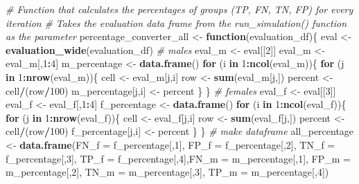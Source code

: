 \documentclass[]{article}
\newenvironment{Shaded}{\begin{snugshade}}{\end{snugshade}}
\newcommand{\KeywordTok}[1]{\textcolor[rgb]{0.13,0.29,0.53}{\textbf{#1}}}
\newcommand{\DataTypeTok}[1]{\textcolor[rgb]{0.13,0.29,0.53}{#1}}
\newcommand{\DecValTok}[1]{\textcolor[rgb]{0.00,0.00,0.81}{#1}}
\newcommand{\StringTok}[1]{\textcolor[rgb]{0.31,0.60,0.02}{#1}}
\newcommand{\CommentTok}[1]{\textcolor[rgb]{0.56,0.35,0.01}{\textit{#1}}}
\newcommand{\ControlFlowTok}[1]{\textcolor[rgb]{0.13,0.29,0.53}{\textbf{#1}}}
\newcommand{\OperatorTok}[1]{\textcolor[rgb]{0.81,0.36,0.00}{\textbf{#1}}}
\newcommand{\NormalTok}[1]{#1}
\begin{document}
\begin{Shaded}
\begin{Highlighting}[]
{{{{{{{{{{\CommentTok{# Function that calculates the percentages of groups (TP, FN, TN, FP) for every iteration}
\CommentTok{# Takes the evaluation data frame from the run_simulation() function as the parameter}
\NormalTok{percentage_converter_all <-}\StringTok{ }\ControlFlowTok{function}\NormalTok{(evaluation_df)\{}
\NormalTok{  eval <-}\StringTok{ }\KeywordTok{evaluation_wide}\NormalTok{(evaluation_df)}
  \CommentTok{# males}
\NormalTok{  eval_m <-}\StringTok{ }\NormalTok{eval[[}\DecValTok{2}\NormalTok{]]}
\NormalTok{  eval_m <-}\StringTok{ }\NormalTok{eval_m[,}\DecValTok{1}\OperatorTok{:}\DecValTok{4}\NormalTok{]}
\NormalTok{  m_percentage <-}\StringTok{ }\KeywordTok{data.frame}\NormalTok{()}
  \ControlFlowTok{for}\NormalTok{ (i }\ControlFlowTok{in} \DecValTok{1}\OperatorTok{:}\KeywordTok{ncol}\NormalTok{(eval_m))\{}
    \ControlFlowTok{for}\NormalTok{ (j }\ControlFlowTok{in} \DecValTok{1}\OperatorTok{:}\KeywordTok{nrow}\NormalTok{(eval_m))\{}
\NormalTok{      cell <-}\StringTok{ }\NormalTok{eval_m[j,i]}
\NormalTok{      row <-}\StringTok{ }\KeywordTok{sum}\NormalTok{(eval_m[j,])}
\NormalTok{      percent <-}\StringTok{ }\NormalTok{cell}\OperatorTok{/}\NormalTok{(row}\OperatorTok{/}\DecValTok{100}\NormalTok{)}
\NormalTok{      m_percentage[j,i] <-}\StringTok{ }\NormalTok{percent}
\NormalTok{    \}}
\NormalTok{  \}}
  \CommentTok{# females}
\NormalTok{  eval_f <-}\StringTok{ }\NormalTok{eval[[}\DecValTok{3}\NormalTok{]]}
\NormalTok{  eval_f <-}\StringTok{ }\NormalTok{eval_f[,}\DecValTok{1}\OperatorTok{:}\DecValTok{4}\NormalTok{]}
\NormalTok{  f_percentage <-}\StringTok{ }\KeywordTok{data.frame}\NormalTok{()}
  \ControlFlowTok{for}\NormalTok{ (i }\ControlFlowTok{in} \DecValTok{1}\OperatorTok{:}\KeywordTok{ncol}\NormalTok{(eval_f))\{}
    \ControlFlowTok{for}\NormalTok{ (j }\ControlFlowTok{in} \DecValTok{1}\OperatorTok{:}\KeywordTok{nrow}\NormalTok{(eval_f))\{}
\NormalTok{      cell <-}\StringTok{ }\NormalTok{eval_f[j,i]}
\NormalTok{      row <-}\StringTok{ }\KeywordTok{sum}\NormalTok{(eval_f[j,])}
\NormalTok{      percent <-}\StringTok{ }\NormalTok{cell}\OperatorTok{/}\NormalTok{(row}\OperatorTok{/}\DecValTok{100}\NormalTok{)}
\NormalTok{      f_percentage[j,i] <-}\StringTok{ }\NormalTok{percent}
\NormalTok{    \}}
\NormalTok{  \}}
  \CommentTok{# make dataframe}
\NormalTok{  all_percentage <-}\StringTok{ }\KeywordTok{data.frame}\NormalTok{(}\DataTypeTok{FN_f =}\NormalTok{ f_percentage[,}\DecValTok{1}\NormalTok{], }\DataTypeTok{FP_f =}\NormalTok{ f_percentage[,}\DecValTok{2}\NormalTok{], }\DataTypeTok{TN_f =}\NormalTok{ f_percentage[,}\DecValTok{3}\NormalTok{], }\DataTypeTok{TP_f =}\NormalTok{ f_percentage[,}\DecValTok{4}\NormalTok{],}\DataTypeTok{FN_m =}\NormalTok{ m_percentage[,}\DecValTok{1}\NormalTok{], }\DataTypeTok{FP_m =}\NormalTok{ m_percentage[,}\DecValTok{2}\NormalTok{], }\DataTypeTok{TN_m =}\NormalTok{ m_percentage[,}\DecValTok{3}\NormalTok{], }\DataTypeTok{TP_m =}\NormalTok{ m_percentage[,}\DecValTok{4}\NormalTok{])}

}}}}}}}}}}
\end{Highlighting}
\end{Shaded}
\end{document}
